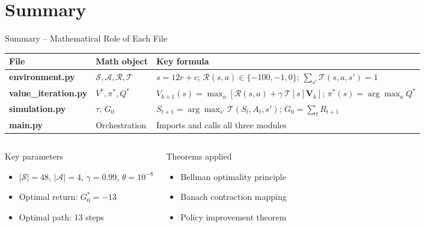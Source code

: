 \documentclass[aspectratio=169,8pt]{beamer}
\newcommand{\St}{\mathcal{S}}
\newcommand{\Act}{\mathcal{A}}
\newcommand{\Vopt}{V^{*}}
\newcommand{\piopt}{\pi^{*}}
\begin{document}
\section{Summary}

\begin{frame}{Summary -- Mathematical Role of Each File}
  \renewcommand{\arraystretch}{1.4}
  \begin{tabular}{>{\bfseries}p{3.0cm}
                  p{3.2cm}
                  p{5.8cm}}
    \toprule
    File & Math object & Key formula \\
    \midrule
    environment.py
      & $\St,\Act,\mathcal{R},\mathcal{T}$
      & $s=12r+c$;\;
        $\mathcal{R}(s,a)\in\{-100,-1,0\}$;\;
        $\sum_{s'}\mathcal{T}(s,a,s')=1$ \\[4pt]
    value\_iteration.py
      & $\Vopt,\piopt,Q^*$
      & $V_{k+1}(s)=\max_a[\mathcal{R}(s,a)
        +\gamma\,\mathcal{T}[s]\mathbf{V}_k]$;\;
        $\piopt(s)=\arg\max_a Q^*$ \\[4pt]
    simulation.py
      & $\tau,\,G_0$
      & $S_{t+1}=\arg\max_{s'}\mathcal{T}(S_t,A_t,s')$;\;
        $G_0=\sum_t R_{t+1}$ \\[4pt]
    main.py
      & Orchestration
      & Imports and calls all three modules \\
    \bottomrule
  \end{tabular}

  \bigskip
  \begin{columns}[T]
    \begin{block}{Key parameters}
      \begin{itemize}
        \item $|\St|=48$, $|\Act|=4$,
              $\gamma=0.99$, $\theta=10^{-8}$
        \item Optimal return: $G_0^*=-13$
        \item Optimal path: 13 steps
      \end{itemize}
    \end{block}
    \begin{block}{Theorems applied}
      \begin{itemize}
        \item Bellman optimality principle
        \item Banach contraction mapping
        \item Policy improvement theorem
      \end{itemize}
    \end{block}
  \end{columns}
\end{frame}
\end{document}

